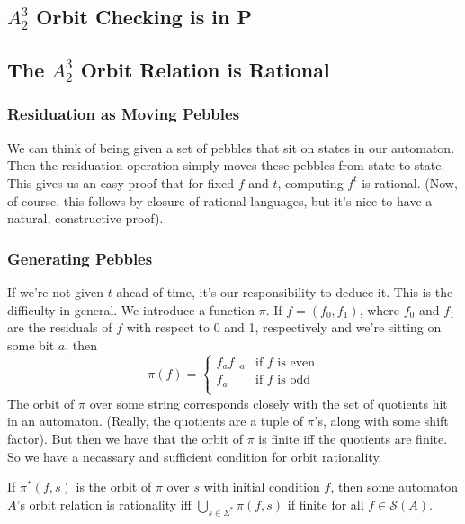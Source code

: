\documentclass{article}
\newcommand{\0}{\underline{0}}
\newcommand{\1}{\underline{1}}
\newcommand{\2}{\underline{2}}
\renewcommand{\S}{\mathcal{S}}
\begin{document}
\subsection*{$A^3_2$ Orbit Checking is in P}

\subsection*{The $A^3_2$ Orbit Relation is Rational}

\subsubsection*{Residuation as Moving Pebbles}
We can think of being given a set of pebbles that sit on states in our automaton. Then the residuation operation simply moves these pebbles from state to state. This gives us an easy proof that for fixed $f$ and $t$, computing $f^t$ is rational. (Now, of course, this follows by closure of rational languages, but it's nice to have a natural, constructive proof).

\subsubsection*{Generating Pebbles}
If we're not given $t$ ahead of time, it's our responsibility to deduce it. This is the difficulty in general. We introduce a function $\pi$. If $f = (f_0, f_1)$, where $f_0$ and $f_1$ are the residuals of $f$ with respect to 0 and 1, respectively and we're sitting on some bit $a$, then
$$\pi(f) = \begin{cases}
f_af_{\neg a} & \text{if $f$ is even} \\
f_a & \text{if $f$ is odd} \\
\end{cases}
$$
The orbit of $\pi$ over some string corresponds closely with the set of quotients hit in an automaton. (Really, the quotients are a tuple of $\pi$'s, along with some shift factor). But then we have that the orbit of $\pi$ is finite iff the quotients are finite. So we have a necassary and sufficient condition for orbit rationality.

If $\pi^*(f, s)$ is the orbit of $\pi$ over $s$ with initial condition $f$, then some automaton $A$'s orbit relation is rationality iff $\bigcup_{s\in \Sigma^*} \pi(f, s)$ if finite for all $f \in \S(A)$.
\end{document}
